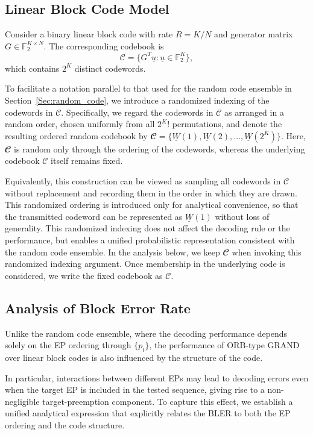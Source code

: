 \documentclass[letterpaper,draftclsnofoot,onecolumn]{IEEEtran}
\begin{document}
\subsection{Linear Block Code Model}\label{SubSec:linear_channel_model}

Consider a binary linear block code with rate $R=K/N$ and generator matrix 
$G\in\mathbb{F}_2^{K\times N}$. The corresponding codebook is
\begin{equation}
\mathcal{C}=\{G^T\underline{u}:\underline{u}\in\mathbb{F}_2^K\},
\end{equation}
which contains $2^K$ distinct codewords.

To facilitate a notation parallel to that used for the random code ensemble in Section~\ref{Sec:random_code}, we introduce a randomized indexing of the codewords in $\mathcal{C}$. Specifically, we regard the codewords in $\mathcal{C}$ as arranged in a random order, chosen uniformly from all $2^K!$ permutations, and denote the resulting ordered random codebook by $\mathbfcal{C}=\{\underline{W}(1),\underline{W}(2),\ldots,\underline{W}(2^K)\}$. Here, $\mathbfcal{C}$ is random only through the ordering of the codewords, whereas the underlying codebook $\mathcal{C}$ itself remains fixed.

Equivalently, this construction can be viewed as sampling all codewords in $\mathcal{C}$ without replacement and recording them in the order in which they are drawn. This randomized ordering is introduced only for analytical convenience, so that the transmitted codeword can be represented as $\underline{W}(1)$ without loss of generality. This randomized indexing does not affect the decoding rule or the performance, but enables a unified probabilistic representation consistent with the random code ensemble.
In the analysis below, we keep $\mathbfcal{C}$ when invoking this randomized indexing argument. Once membership in the underlying code is considered, we write the fixed codebook as $\mathcal{C}$.

\subsection{Analysis of Block Error Rate}\label{SubSec:linear_error_rate}
Unlike the random code ensemble, where the decoding performance depends solely on the EP ordering through $\{p_t\}$, the performance of ORB-type GRAND over linear block codes is also influenced by the structure of the code.

In particular, interactions between different EPs may lead to decoding errors even when the target EP is included in the tested sequence, giving rise to a non-negligible target-preemption component. To capture this effect, we establish a unified analytical expression that explicitly relates the BLER to both the EP ordering and the code structure.
\end{document}
